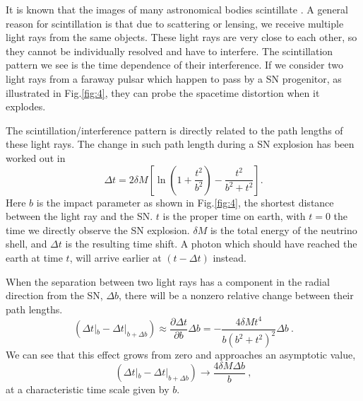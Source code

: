\documentclass[aps,showpacs,onecolumn,floats,prd,superscriptaddress,nofootinbib]{revtex4-1}
\begin{document}
It is known that the images of many astronomical bodies scintillate \cite{PulsarScint}. A general reason for scintillation is that due to scattering or lensing, we receive multiple light rays from the same objects. These light rays are very close to each other, so they cannot be individually resolved and have to interfere. The scintillation pattern we see is the time dependence of their interference. If we consider two light rays from a faraway pulsar which happen to pass by a SN progenitor, as illustrated in Fig.\ref{fig:4}, they can probe the spacetime distortion when it explodes. 

The scintillation/interference pattern is directly related to the path lengths of these light rays. The change in such path length during a SN explosion has been worked out in \cite{Olum:2013gza}
\begin{equation}
	\Delta t = 2\delta M \left[ \ln \left(1 + \frac{t^2}{b^2} \right) - \frac{t^2}{b^2 + t^2} \right].
\end{equation}
Here $b$ is the impact parameter as shown in Fig.\ref{fig:4}, the shortest distance between the light ray and the SN. $t$ is the proper time on earth, with $t=0$ the time we directly observe the SN explosion. $\delta M$ is the total energy of the neutrino shell, and $\Delta t$ is the resulting time shift. A photon which should have reached the earth at time $t$, will arrive earlier at $(t-\Delta t)$ instead.

When the separation between two light rays has a component in the radial direction from the SN, $\Delta b$, there will be a nonzero relative change between their path lengths.
\begin{equation}
	(\Delta t|_b - \Delta t|_{b+\Delta b}) \approx 
	\frac{\partial \Delta t}{\partial b} \Delta b 
	= - \frac{4\delta Mt^4}{b(b^2 + t^2)^2} \Delta b~.
	\label{eq-change}
\end{equation}
We can see that this effect grows from zero and approaches an asymptotic value,
\begin{equation}
	(\Delta t|_b - \Delta t|_{b+\Delta b}) 
	\longrightarrow \frac{4\delta M \Delta b}{b}~,	\label{pulsescint}
\end{equation}
at a characteristic time scale given by $b$.
\end{document}
